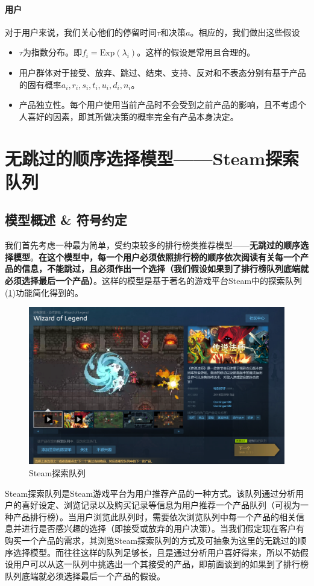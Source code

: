 \documentclass[UTF8]{ctexart}
\theoremstyle{plain}
\theoremstyle{definition}
\theoremstyle{remark}
\begin{document}
	\paragraph{用户} 对于用户来说，我们关心他们的停留时间$\tau$和决策$a$。相应的，我们做出这些假设
	\begin{itemize}
		\item $\tau$为指数分布。即$f_i = \mathrm{Exp}(\lambda_i)$。这样的假设是常用且合理的。
		\item 用户群体对于接受、放弃、跳过、结束、支持、反对和不表态分别有基于产品的固有概率$a_i,r_i,s_i,t_i,u_i,d_i,n_i$。
		\item 产品独立性。每个用户使用当前产品时不会受到之前产品的影响，且不考虑个人喜好的因素，即其所做决策的概率完全有产品本身决定。
	\end{itemize}
	
	\section{无跳过的顺序选择模型——Steam探索队列}
	\subsection{模型概述 \& 符号约定}
	我们首先考虑一种最为简单，受约束较多的排行榜类推荐模型——\textbf{无跳过的顺序选择模型}。\textbf{在这个模型中，每一个用户必须依照排行榜的顺序依次阅读有关每一个产品的信息，不能跳过，且必须作出一个选择（我们假设如果到了排行榜队列底端就必须选择最后一个产品）}。这样的模型是基于著名的游戏平台Steam中的探索队列(\ref{modelA_fig_1})功能简化得到的。
	\begin{figure}[h!]
		\centering
		\includegraphics[width = 12cm]{modelA_fig_1.png}
		\caption{Steam探索队列}\label{modelA_fig_1}
	\end{figure}
	Steam探索队列是Steam游戏平台为用户推荐产品的一种方式。该队列通过分析用户的喜好设定、浏览记录以及购买记录等信息为用户推荐一个产品队列（可视为一种产品排行榜）。当用户浏览此队列时，需要依次浏览队列中每一个产品的相关信息并进行是否感兴趣的选择（即接受或放弃的用户决策）。当我们假定现在客户有购买一个产品的需求，其浏览Steam探索队列的方式及可抽象为这里的无跳过的顺序选择模型。而往往这样的队列足够长，且是通过分析用户喜好得来，所以不妨假设用户可以从这一队列中挑选出一个其接受的产品，即前面谈到的如果到了排行榜队列底端就必须选择最后一个产品的假设。 \\
	
\end{document}
